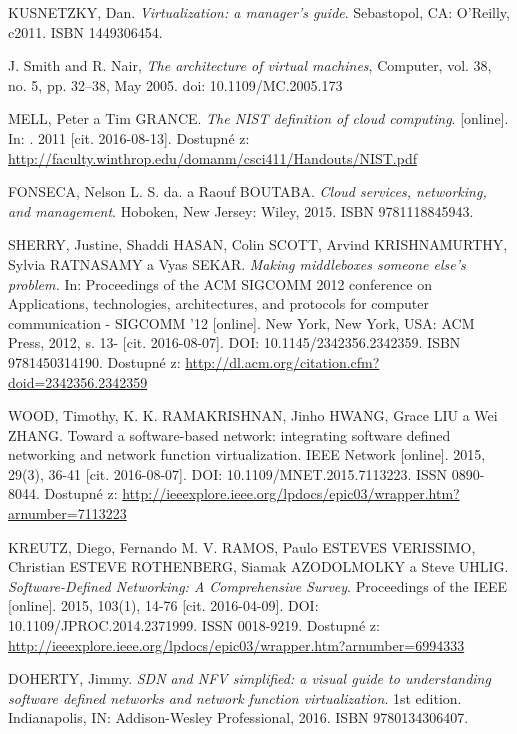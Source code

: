\begin{thebibliography}{10}
KUSNETZKY, Dan. \emph{Virtualization: a manager's guide}. Sebastopol, CA: O'Reilly, c2011. ISBN 1449306454.

J. Smith and R. Nair, \emph{The architecture of virtual machines}, Computer, vol. 38, no. 5, pp. 32–38, May 2005. doi: 10.1109/MC.2005.173

MELL, Peter a Tim GRANCE. \emph{The NIST definition of cloud computing}. [online]. In: . 2011 [cit. 2016-08-13]. Dostupné z: \url{http://faculty.winthrop.edu/domanm/csci411/Handouts/NIST.pdf}

FONSECA, Nelson L. S. da. a Raouf BOUTABA. \emph{Cloud services, networking, and management}. Hoboken, New Jersey: Wiley, 2015. ISBN 9781118845943.

SHERRY, Justine, Shaddi HASAN, Colin SCOTT, Arvind KRISHNAMURTHY, Sylvia RATNASAMY a Vyas SEKAR. \emph{Making middleboxes someone else's problem.} In: Proceedings of the ACM SIGCOMM 2012 conference on Applications, technologies, architectures, and protocols for computer communication - SIGCOMM '12 [online]. New York, New York, USA: ACM Press, 2012, s. 13- [cit. 2016-08-07]. DOI: 10.1145/2342356.2342359. ISBN 9781450314190. Dostupné z: \url{http://dl.acm.org/citation.cfm?doid=2342356.2342359}

WOOD, Timothy, K. K. RAMAKRISHNAN, Jinho HWANG, Grace LIU a Wei ZHANG. Toward a software-based network: integrating software defined networking and network function virtualization. IEEE Network [online]. 2015, 29(3), 36-41 [cit. 2016-08-07]. DOI: 10.1109/MNET.2015.7113223. ISSN 0890-8044. Dostupné z: \url{http://ieeexplore.ieee.org/lpdocs/epic03/wrapper.htm?arnumber=7113223}

KREUTZ, Diego, Fernando M. V. RAMOS, Paulo ESTEVES VERISSIMO, Christian ESTEVE ROTHENBERG, Siamak AZODOLMOLKY a Steve UHLIG. \emph{Software-Defined Networking: A Comprehensive Survey}. Proceedings of the IEEE [online]. 2015, 103(1), 14-76 [cit. 2016-04-09]. DOI: 10.1109/JPROC.2014.2371999. ISSN 0018-9219. Dostupné z: \url{http://ieeexplore.ieee.org/lpdocs/epic03/wrapper.htm?arnumber=6994333}

 DOHERTY, Jimmy. \emph{SDN and NFV simplified: a visual guide to understanding software defined networks and network function virtualization}. 1st edition. Indianapolis, IN: Addison-Wesley Professional, 2016. ISBN 9780134306407.



\end{thebibliography}
